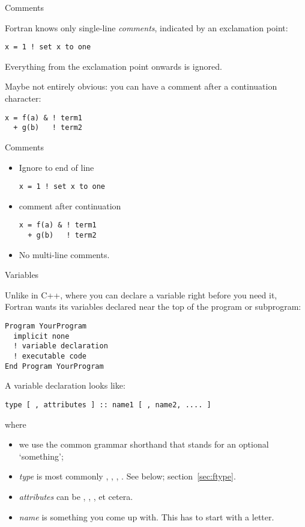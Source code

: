  {Comments}

Fortran knows only single-line
\emph{comments},
indicated by an exclamation point:
\begin{lstlisting}
x = 1 ! set x to one
\end{lstlisting}
Everything from the exclamation point onwards is ignored.

Maybe not entirely obvious: you can have a comment after a
continuation character:
\begin{lstlisting}
x = f(a) & ! term1 
  + g(b)   ! term2
\end{lstlisting}

\begin{slide}{Comments}
  \label{sl:fcomment}
  \begin{itemize}
  \item Ignore to end of line
\begin{lstlisting}
x = 1 ! set x to one
\end{lstlisting}
\item comment after continuation
\begin{lstlisting}
x = f(a) & ! term1 
  + g(b)   ! term2
\end{lstlisting}
  \item No multi-line comments.
  \end{itemize}
\end{slide}

 {Variables}

Unlike in C++, where you can declare a variable right before you need
it, Fortran wants its variables declared near the top of the program
or subprogram:
\begin{lstlisting}
Program YourProgram
  implicit none
  ! variable declaration
  ! executable code
End Program YourProgram
\end{lstlisting}
A variable declaration looks like:
\begin{lstlisting}
type [ , attributes ] :: name1 [ , name2, .... ]
\end{lstlisting}
where
\begin{itemize}
\item we use the common grammar shorthand that \n{[ something ]}
  stands for an optional `something';
\item \textit{type} is most commonly , , ,
  . See below; section~\ref{sec:ftype}.
\item \textit{attributes} can be , ,
  ,  et cetera.
\item \textit{name} is something you come up with. This has to start
  with a letter.
\end{itemize}

